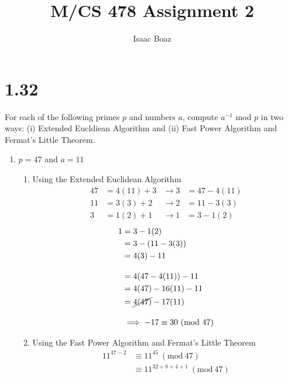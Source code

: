 \documentclass{article}
\title{\vspace*{-2em}M/CS 478 Assignment 2}
\author{Isaac Boaz}
\newcommand{\Mod}[1]{\ (\mathrm{mod}\ #1)}
\begin{document}
\maketitle

\section*{1.32}
For each of the following primes $p$ and numbers $a$, compute $a^{-1}$ mod $p$ in
two ways: (i) Extended Eucldiean Algorithm and (ii) Fast Power Algorithm and Fermat's Little Theorem.
\begin{enumerate}[label=\alph*)]
    \item $p = 47$ and $a = 11$
          \begin{enumerate}[label=(\roman*)]
              \item Using the Extended Euclidean Algorithm
                    \begin{align*}
                        47 & = 4(11) + 3 & \rightarrow 3 & =47-4(11) \\
                        11 & = 3(3) + 2  & \rightarrow 2 & =11-3(3)  \\
                        3  & = 1(2) + 1  & \rightarrow 1 & =3-1(2)
                    \end{align*}
                    \begin{align*}
                        1 & = 3 - 1(2)                      \\
                          & = 3 - (11-3(3))                 \\
                          & = 4(3) - 11                     \\[1em]
                          & = 4(47 - 4(11)) - 11            \\
                          & =4(47) - 16(11) - 11            \\
                          & =\cancel{4(47)} - 17(11)        \\[1em]
                          & \implies -17 \equiv 30 \Mod{47}
                    \end{align*}
              \item Using the Fast Power Algorithm and Fermat's Little Theorem
                    \begin{align*}
                        11^{47-2} & \equiv 11^{45} \Mod{47}                                    \\
                                  & \equiv 11^{32+8+4+1} \Mod{47}                              \\

\end{align*}
\end{enumerate}
\end{enumerate}
\end{document}

